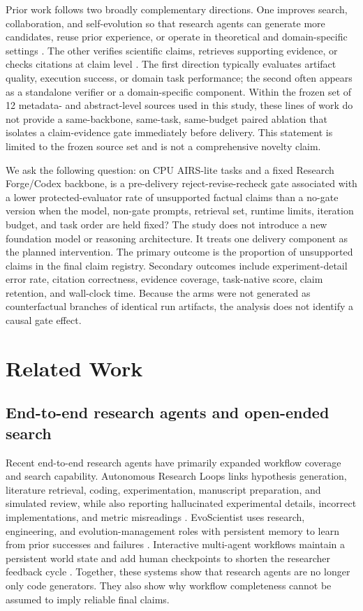 \documentclass[11pt]{article}
\begin{document}
Prior work follows two broadly complementary directions. One improves search, collaboration, and self-evolution so that research agents can generate more candidates, reuse prior experience, or operate in theoretical and domain-specific settings \cite{evo,nova,hypo,reasflow,triagent,medagent}. The other verifies scientific claims, retrieves supporting evidence, or checks citations at claim level \cite{cliver,ece,reflens}. The first direction typically evaluates artifact quality, execution success, or domain task performance; the second often appears as a standalone verifier or a domain-specific component. Within the frozen set of 12 metadata- and abstract-level sources used in this study, these lines of work do not provide a same-backbone, same-task, same-budget paired ablation that isolates a claim-evidence gate immediately before delivery. This statement is limited to the frozen source set and is not a comprehensive novelty claim.

We ask the following question: on CPU AIRS-lite tasks and a fixed Research Forge/Codex backbone, is a pre-delivery reject-revise-recheck gate associated with a lower protected-evaluator rate of unsupported factual claims than a no-gate version when the model, non-gate prompts, retrieval set, runtime limits, iteration budget, and task order are held fixed? The study does not introduce a new foundation model or reasoning architecture. It treats one delivery component as the planned intervention. The primary outcome is the proportion of unsupported claims in the final claim registry. Secondary outcomes include experiment-detail error rate, citation correctness, evidence coverage, task-native score, claim retention, and wall-clock time. Because the arms were not generated as counterfactual branches of identical run artifacts, the analysis does not identify a causal gate effect.

\section{Related Work}

\subsection{End-to-end research agents and open-ended search}

Recent end-to-end research agents have primarily expanded workflow coverage and search capability. Autonomous Research Loops links hypothesis generation, literature retrieval, coding, experimentation, manuscript preparation, and simulated review, while also reporting hallucinated experimental details, incorrect implementations, and metric misreadings \cite{arl}. EvoScientist uses research, engineering, and evolution-management roles with persistent memory to learn from prior successes and failures \cite{evo}. Interactive multi-agent workflows maintain a persistent world state and add human checkpoints to shorten the researcher feedback cycle \cite{rethink}. Together, these systems show that research agents are no longer only code generators. They also show why workflow completeness cannot be assumed to imply reliable final claims.
\end{document}
